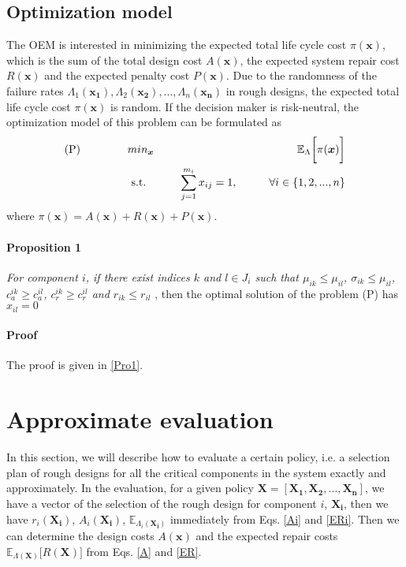\documentclass[preprint,12pt]{elsarticle}
\begin{document}
\subsection{Optimization model}
The OEM is interested in minimizing the expected total life cycle cost $\pi(\boldsymbol{x})$, which is the sum of the total design cost $A(\boldsymbol{x})$, the expected system repair cost $R(\boldsymbol{x})$ and the expected penalty cost $P(\boldsymbol{x})$. Due to the randomness of the failure rates $\Lambda_{1}(\boldsymbol{x_{1}}),\Lambda_{2}(\boldsymbol{x_{2}}),...,\Lambda_{n}(\boldsymbol{x_{n}})$ in rough designs, the expected total life cycle cost $\pi(\boldsymbol{x})$ is random. If the decision maker is risk-neutral, the optimization model of this problem can be formulated as
\begin{eqnarray}
\text{(P)} \hspace{15mm} & min_{\boldsymbol{x}} & \hspace{10mm} \mathbb{E}_{\Lambda} \bigg[ \pi(\boldsymbol{x})\bigg] \nonumber\\
& \text{ s.t. }&  \hspace{5mm} \sum_{j=1}^{m_i}{x_{ij}}=1, \hspace{10mm} \forall i \in \{1,2,...,n\} \nonumber
\end{eqnarray}
where $\pi(\boldsymbol{x})=A(\boldsymbol{x})+R(\boldsymbol{x})+P(\boldsymbol{x})$.

\paragraph{\textbf{Proposition 1}} \textit{For component $i$, if there exist indices $k$ and $l\in J_{i}$ such that $\mu_{ik}\leq \mu_{il}$, $\sigma_{ik}\leq \mu_{il}$, $c^{ik}_{a}\geq c^{il}_{a} $, $c^{ik}_{r}\geq c^{il}_{r} $ and $r_{ik} \leq r_{il}$ },  then the optimal solution of the problem (P) has $x_{il}=0$

\paragraph{\textbf{Proof}} The proof is given in \ref{Pro1}.


\section{Approximate evaluation}

In this section, we will describe how to evaluate a certain policy, i.e. a selection plan of rough designs for all the critical components in the system exactly and approximately. In the evaluation, for a given policy $\boldsymbol{X}=[\boldsymbol{X_{1}},\boldsymbol{X_{2}},\dots,\boldsymbol{X_{n}}]$, we have a vector of the selection of the rough design for component $i$, $\boldsymbol{X_{i}}$, then we have $r_{i}(\boldsymbol{X_{i}})$, $A_{i}(\boldsymbol{X_{i}})$, $\mathbb{E}_{\Lambda_{i}(\boldsymbol{X_{i}})}$ immediately from Eqs. \eqref{Ai} and \eqref{ERi}. Then we can determine the design costs $A(\boldsymbol{x})$ and the expected repair costs $\mathbb{E}_{\Lambda(\boldsymbol{X})} \bigg[ R(\boldsymbol{X}) \bigg]$ from Eqs. \eqref{A} and \eqref{ER}.
\end{document}
